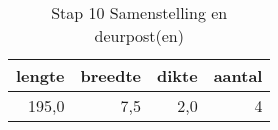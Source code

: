 \begin{table}[h!]
\centering
\caption{Stap 10 Samenstelling en deurpost(en)}
\begin{tabular}{rrrr}
\toprule
 lengte &  breedte &  dikte &  aantal \\
\midrule
  195,0 &      7,5 &    2,0 &       4 \\
\bottomrule
\end{tabular}
\end{table}
